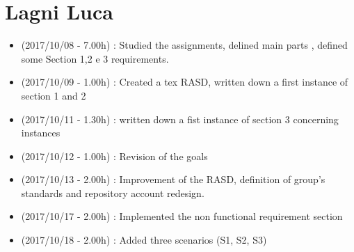 \documentclass[a4paper,leqno]{book}
\begin{document}
\section{Lagni Luca}
\begin{itemize}
\item (2017/10/08 - 7.00h) : Studied the assignments, delined main parts , defined some Section 1,2 e 3 requirements.
\item (2017/10/09 - 1.00h) : Created a tex RASD, written down a first instance of section 1 and 2
\item (2017/10/11 - 1.30h) : written down a fist instance of section 3 concerning instances
\item (2017/10/12 - 1.00h) : Revision of the goals 
\item (2017/10/13 - 2.00h) : Improvement of the RASD, definition of group's standards and repository account redesign.
\item (2017/10/17 - 2.00h) : Implemented the non functional requirement section
\item (2017/10/18 - 2.00h) : Added three scenarios (S1, S2, S3)
\end{itemize}
\end{document}
